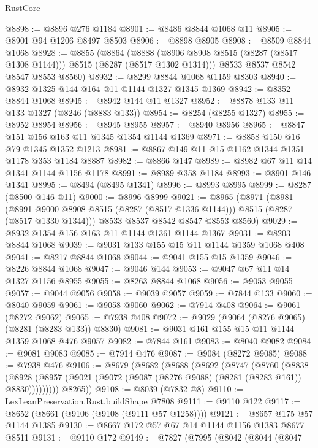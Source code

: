 \begin{lexlean}{RustCore}
\begin{coremodule}
@8898 := @8896 @276 @1184
@8901 := @8486 @8844 @1068 @11
@8905 := @8901 @94 @1206 @8497 @8503
@8906 := @8898 @8905
@8908 := @8509 @8844 @1068
@8928 := @8855
    (@8864
      (@8888 (@8906 @8908 @8515 (@8287 (@8517 @1308 @1144))) @8515 (@8287 (@8517 @1302 @1314)))
      @8533
      @8537
      @8542
      @8547
      @8553
      @8560)
@8932 := @8299 @8844 @1068 @1159 @8303
@8940 := @8932 @1325 @144 @164 @11 @1144 @1327 @1345 @1369
@8942 := @8352 @8844 @1068
@8945 := @8942 @144 @11 @1327
@8952 := @8878 @133 @11 @133 @1327 (@8246 (@8883 @133))
@8954 := @8254 (@8255 @1327)
@8955 := @8952 @8954
@8956 := @8945 @8955
@8957 := @8940 @8956
@8965 := @8847 @151 @156 @163 @11 @1345 @1354 @1144 @1369
@8971 := @8858 @150 @16 @79 @1345 @1352 @1213
@8981 := @8867 @149 @11 @15 @1162 @1344 @1351 @1178 @353 @1184 @8887
@8982 := @8866 @147
@8989 := @8982 @67 @11 @14 @1341 @1144 @1156 @1178
@8991 := @8989 @358 @1184
@8993 := @8901 @146 @1341
@8995 := @8494 (@8495 @1341)
@8996 := @8993 @8995
@8999 := @8287 (@8500 @146 @11)
@9000 := @8996 @8999
@9021 := @8965
    (@8971
      (@8981
        (@8991 @9000 @8908 @8515 (@8287 (@8517 @1336 @1144)))
        @8515
        (@8287 (@8517 @1330 @1344)))
      @8533
      @8537
      @8542
      @8547
      @8553
      @8560)
@9029 := @8932 @1354 @156 @163 @11 @1144 @1361 @1144 @1367
@9031 := @8203 @8844 @1068
@9039 := @9031 @133 @155 @15 @11 @1144 @1359 @1068 @408
@9041 := @8217 @8844 @1068
@9044 := @9041 @155 @15 @1359
@9046 := @8226 @8844 @1068
@9047 := @9046 @144
@9053 := @9047 @67 @11 @14 @1327 @1156 @8955
@9055 := @8263 @8844 @1068
@9056 := @9053 @9055
@9057 := @9044 @9056
@9058 := @9039 @9057
@9059 := @7844 @133
@9060 := @8040 @9059
@9061 := @9058 @9060
@9062 := @7914 @408
@9064 := @9061 (@8272 @9062)
@9065 := @7938 @408
@9072 := @9029 (@9064 (@8276 @9065) (@8281 (@8283 @133)) @8830)
@9081 := @9031 @161 @155 @15 @11 @1144 @1359 @1068 @476 @9057
@9082 := @7844 @161
@9083 := @8040 @9082
@9084 := @9081 @9083
@9085 := @7914 @476
@9087 := @9084 (@8272 @9085)
@9088 := @7938 @476
@9106 := @8679
    (@8682
      (@8688
        (@8692
          (@8747
            (@8760
              (@8838
                (@8928 (@8957 (@9021 (@9072 (@9087 (@8276 @9088) (@8281 (@8283 @161)) @8830)))))))))
        @8265))
@9108 := @8039 (@7832 @8)
@9110 := LexLeanPreservation.Rust.buildShape @7808
@9111 := @9110 @122
@9117 := @8652 (@8661 (@9106 (@9108 (@9111 @57 @1258))))
@9121 := @8657 @175 @57 @1144 @1385
@9130 := @8667 @172 @57 @67 @14 @1144 @1156 @1383 @8677 @8511
@9131 := @9110 @172
@9149 := @7827
    (@7995
      (@8042
        (@8044
          (@8047

\end{coremodule}
\end{lexlean}
